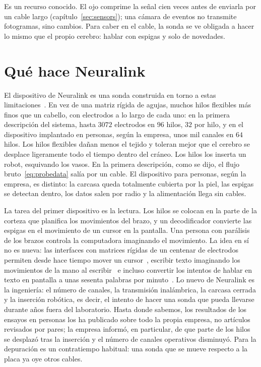 Es un recurso conocido. El ojo comprime la señal cien veces antes de enviarla por un cable largo (capítulo~\ref{sec:sensors}); una cámara de eventos no transmite fotogramas, sino cambios. Para caber en el cable, la sonda se ve obligada a hacer lo mismo que el propio cerebro: hablar con espigas y solo de novedades.

\section{Qué hace Neuralink}

El dispositivo de Neuralink es una sonda construida en torno a estas limitaciones~\cite{Musk2019}. En vez de una matriz rígida de agujas, muchos hilos flexibles más finos que un cabello, con electrodos a lo largo de cada uno: en la primera descripción del sistema, hasta $3072$ electrodos en $96$ hilos, $32$ por hilo, y en el dispositivo implantado en personas, según la empresa, unos mil canales en $64$ hilos. Los hilos flexibles dañan menos el tejido y toleran mejor que el cerebro se desplace ligeramente todo el tiempo dentro del cráneo. Los hilos los inserta un robot, esquivando los vasos. En la primera descripción, como se dijo, el flujo bruto~\eqref{eq:probedata} salía por un cable. El dispositivo para personas, según la empresa, es distinto: la carcasa queda totalmente cubierta por la piel, las espigas se detectan dentro, los datos salen por radio y la alimentación llega sin cables.

La tarea del primer dispositivo es la lectura. Los hilos se colocan en la parte de la corteza que planifica los movimientos del brazo, y un decodificador convierte las espigas en el movimiento de un cursor en la pantalla. Una persona con parálisis de los brazos controla la computadora imaginando el movimiento. La idea en sí no es nueva: las interfaces con matrices rígidas de un centenar de electrodos permiten desde hace tiempo mover un cursor~\cite{Hochberg2006}, escribir texto imaginando los movimientos de la mano al escribir~\cite{Willett2021} e incluso convertir los intentos de hablar en texto en pantalla a unas sesenta palabras por minuto~\cite{Willett2023}. Lo nuevo de Neuralink es la ingeniería: el número de canales, la transmisión inalámbrica, la carcasa cerrada y la inserción robótica, es decir, el intento de hacer una sonda que pueda llevarse durante años fuera del laboratorio. Hasta donde sabemos, los resultados de los ensayos en personas los ha publicado sobre todo la propia empresa, no artículos revisados por pares; la empresa informó, en particular, de que parte de los hilos se desplazó tras la inserción y el número de canales operativos disminuyó. Para la depuración es un contratiempo habitual: una sonda que se mueve respecto a la placa ya oye otros cables.

